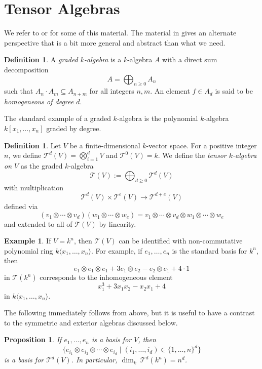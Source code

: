 \documentclass[12pt]{article}
\theoremstyle{plain}
\newtheorem{proposition}[theorem]{Proposition}
\theoremstyle{definition}
\newtheorem{definition}[theorem]{Definition}
\newtheorem{example}[theorem]{Example}
\theoremstyle{remark}
\numberwithin{equation}{section}
\begin{document}
\section{Tensor Algebras}

We refer to \cite[\S{11.5}]{DF} or \cite{Lang} for some of this
material.  The material in \cite[\S{A.2}]{Eisenbud} gives an alternate
perspective that is a bit more general and abstract than what we need.

\begin{definition}
A \emph{graded $k$-algebra} is a $k$-algebra $A$ with a direct sum
decomposition
\[
A = \bigoplus_{n \ge 0} A_n
\]
such that $A_n \cdot A_m \subseteq A_{n+m}$ for all integers $n,m$.
An element $f \in A_d$ is said to be \emph{homogeneous of degree $d$}.
\end{definition}

The standard example of a graded $k$-algebra is the polynomial
$k$-algebra $k[x_1,\ldots,x_n]$ graded by degree.

\begin{definition}
Let $V$ be a finite-dimensional $k$-vector space.  For a positive integer
$n$, we define $\mathcal{T}^d(V)=\bigotimes_{i=1}^d V$ and
$\mathcal{T}^0(V)=k$.  We define the \emph{tensor $k$-algebra on $V$}
as the graded $k$-algebra
\[
\mathcal{T}(V) := \bigoplus_{d \ge 0} \mathcal{T}^d(V)
\]
with multiplication
\[\mathcal{T}^d(V) \times \mathcal{T}^e(V)
\to \mathcal{T}^{d+e}(V)
\]
defined via
\[
(v_1 \otimes \cdots \otimes v_d) (w_1 \otimes \cdots \otimes w_e)
=v_1 \otimes \cdots \otimes v_d \otimes w_1 \otimes \cdots \otimes w_e
\]
and extended to all of $\mathcal{T}(V)$ by linearity. 
\end{definition}

\begin{example}
If $V=k^n$, then $\mathcal{T}(V)$ can be identified with
non-commutative polynomial ring $k\langle x_1,\ldots, x_n\rangle$.
For example, if $e_1,\ldots, e_n$ is the standard basis for $k^n$,
then
\[
e_1 \otimes e_1 \otimes e_1 + 3e_1 \otimes e_2 - e_2\otimes e_1 + 4\cdot 1
\]
in $\mathcal{T}(k^n)$
corresponds to the inhomogeneous element
\[
x_1^3 + 3x_1x_2 - x_2x_1 + 4
\]
in $k\langle x_1,\ldots, x_n\rangle$.
\end{example}

The following immediately follows from above,
but it is useful to have a contrast to the symmetric and exterior
algebras discussed below.

\begin{proposition}
If $e_1, \ldots, e_n$ is a basis for $V$, then
\[
\{
e_{i_1} \otimes e_{i_2} \otimes \cdots \otimes e_{i_d}
\mid
(i_1,\ldots,i_d) \in \{1,\ldots,n\}^d
\}
\]
is a basis for $\mathcal{T}^d(V)$.
In particular, $\dim_k\ \mathcal{T}^d(k^n)=n^d$.
\end{proposition}
\end{document}

